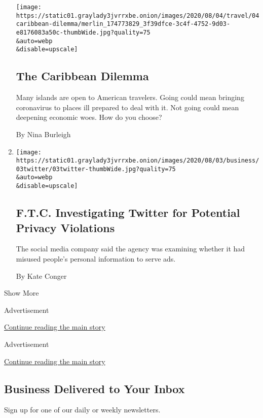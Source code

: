 \begin{enumerate}
  \texttt{[image: https://static01.graylady3jvrrxbe.onion/images/2020/08/04/travel/04caribbean-dilemma/merlin\_174773829\_3f39dfce-3c4f-4752-9d03-e8176083a50c-thumbWide.jpg?quality=75\\\&auto=webp\\\&disable=upscale]}

  \hypertarget{the-caribbean-dilemma}{%
  \subsection{The Caribbean Dilemma}\label{the-caribbean-dilemma}}

  Many islands are open to American travelers. Going could mean bringing
  coronavirus to places ill prepared to deal with it. Not going could
  mean deepening economic woes. How do you choose?

  By Nina Burleigh
\item
  \href{/2020/08/03/technology/ftc-twitter-privacy-violations.html}{}

  \texttt{[image: https://static01.graylady3jvrrxbe.onion/images/2020/08/03/business/03twitter/03twitter-thumbWide.jpg?quality=75\\\&auto=webp\\\&disable=upscale]}

  \hypertarget{ftc-investigating-twitter-for-potential-privacy-violations}{%
  \subsection{F.T.C. Investigating Twitter for Potential Privacy
  Violations}\label{ftc-investigating-twitter-for-potential-privacy-violations}}

  The social media company said the agency was examining whether it had
  misused people's personal information to serve ads.

  By Kate Conger
\end{enumerate}

Show More

Advertisement

\protect\hyperlink{after-mid2}{Continue reading the main story}

Advertisement

\protect\hyperlink{after-mktg}{Continue reading the main story}

\hypertarget{business-delivered-to-your-inbox}{%
\subsection{Business Delivered to Your
Inbox}\label{business-delivered-to-your-inbox}}

Sign up for one of our daily or weekly newsletters.

